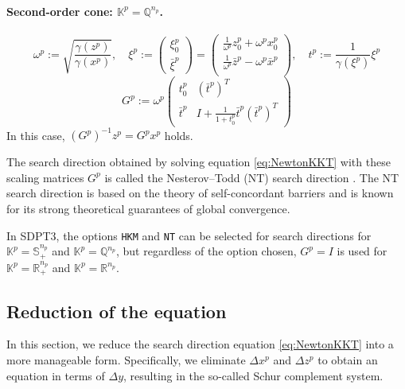 \paragraph{Second-order cone: \(\mathbb{K}^p = \mathbb{Q}^{n_p}\).}
\begin{equation}
    \omega^p := \sqrt{\frac{\gamma(z^p)}{\gamma(x^p)}}, 
    \quad 
    \xi^p 
    := \begin{pmatrix} \xi^p_0 \\ \bar{\xi}^p \end{pmatrix} 
    = \begin{pmatrix}
        \frac{1}{\omega^p} z^p_0 + \omega^p x^p_0 \\
        \frac{1}{\omega^p} \bar{z}^p - \omega^p \bar{x}^p \\
    \end{pmatrix},
    \quad
    t^p := \frac{1}{\gamma(\xi^p)}\xi^p
    \label{eq:scaling_mat_NT_socp_aux}
\end{equation}
\begin{equation}
    G^p := \omega^p \begin{pmatrix}
        t^p_0 & (\bar{t}^p)^T \\
        \bar{t}^p & I+\frac{1}{1 + t^p_0} \bar{t}^p(\bar{t}^p)^T
    \end{pmatrix}
    \label{eq:scaling_mat_NT_socp}
\end{equation}
In this case, $(G^p)^{-1} z^p = G^p x^p$ holds.

The search direction obtained by solving equation \eqref{eq:NewtonKKT} with these scaling matrices $G^p$ is called the Nesterov--Todd (NT) search direction \cite{Nesterov1997,todd1998}. 
The NT search direction is based on the theory of self-concordant barriers and is known for its strong theoretical guarantees of global convergence.

In SDPT3, the options \texttt{HKM} and \texttt{NT} can be selected for search directions for $\mathbb{K}^p = \mathbb{S}^{n_p}_+$ and $\mathbb{K}^p = \mathbb{Q}^{n_p}$, but regardless of the option chosen, $G^p = I$ is used for $\mathbb{K}^p = \mathbb{R}^{n_p}_+$ and $\mathbb{K}^p = \mathbb{R}^{n_p}$.


\subsection{Reduction of the equation}
In this section, we reduce the search direction equation \eqref{eq:NewtonKKT} into a more manageable form. 
Specifically, we eliminate $\Delta x^p$ and $\Delta z^p$ to obtain an equation in terms of $\Delta y$, resulting in the so-called Schur complement system.

